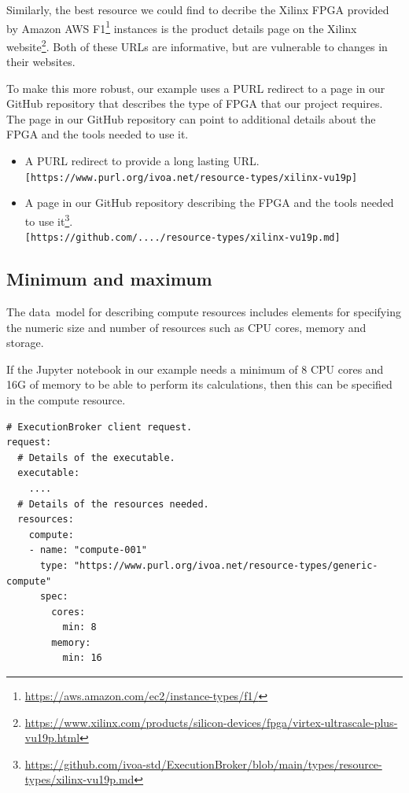 \documentclass[11pt,a4paper]{ivoa}
\newcommand{\datamodel} {data~model}
\newcommand{\jupyternotebook} {Jupyter notebook}
\newcommand{\codeword}[1] {\texttt{#1}}
\newcommand{\footurl}[1] {\footnote{\url{#1}}}
\newcommand{\cpu}[1] {CPU#1}
\begin{document}
Similarly, the best resource we could find to decribe the Xilinx FPGA provided by Amazon AWS
F1\footurl{https://aws.amazon.com/ec2/instance-types/f1/} instances is the product details
page on the Xilinx website\footurl{https://www.xilinx.com/products/silicon-devices/fpga/virtex-ultrascale-plus-vu19p.html}.
Both of these URLs are informative, but are vulnerable to changes in their websites.

To make this more robust, our example uses a PURL redirect to a page in our GitHub repository that describes
the type of FPGA that our project requires. The page in our GitHub repository can point to additional details about the
FPGA and the tools needed to use it.
\begin{itemize}
\item A PURL redirect to provide a long lasting URL.\\
      \codeword{[https://www.purl.org/ivoa.net/resource-types/xilinx-vu19p]}
\item A page in our GitHub repository describing the FPGA and the tools needed to use it\footurl{https://github.com/ivoa-std/ExecutionBroker/blob/main/types/resource-types/xilinx-vu19p.md}.\\
      \codeword{[https://github.com/..../resource-types/xilinx-vu19p.md]}
\end{itemize}

\subsection{Minimum and maximum}
\label{minandmax}

The \datamodel{} for describing compute resources includes elements for specifying the numeric size
and number of resources such as \cpu{} cores, memory and storage.

If the \jupyternotebook{} in our example needs a minimum of 8 \cpu{} cores and 16G of memory
to be able to perform its calculations, then this can be specified in the compute resource.

\begin{lstlisting}[]
# ExecutionBroker client request.
request:
  # Details of the executable.
  executable:
    ....
  # Details of the resources needed.
  resources:
    compute:
    - name: "compute-001"
      type: "https://www.purl.org/ivoa.net/resource-types/generic-compute"
      spec:
        cores:
          min: 8
        memory:
          min: 16
\end{lstlisting}
\end{document}

